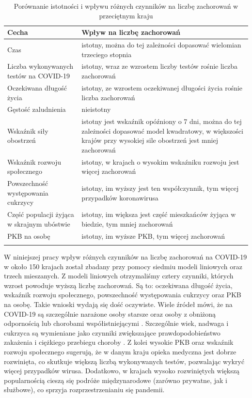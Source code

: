 \documentclass[12pt]{mwbk}
\theoremstyle{plain}
\theoremstyle{definition}
\theoremstyle{definition}
\newcommand\zrodlo[1]{\par\vspace{-3mm}{\small\textit{Źródło: }#1 }}
\begin{document}
\begin{longtable}{| p{} | p{} |}
	\hline
	Cecha & Wpływ na liczbę zachorowań \\ \hline \hline 
	Czas & istotny, można do tej zależności dopasować wielomian trzeciego stopnia \\ \hline
	Liczba wykonywanych testów na COVID-19 & istotny, wraz ze wzrostem liczby testów rośnie liczba zachorowań \\ \hline
	Oczekiwana długość życia & istotny, ze wzrostem oczekiwanej długości życia rośnie liczba zachorowań \\ \hline 
	Gęstość zaludnienia & nieistotny \\ \hline
	Wskaźnik siły obostrzeń & istotny jest wskaźnik opóźniony o 7 dni, można do tej zależności dopasować model kwadratowy, w większości krajów przy wysokiej sile obostrzeń jest mniej zachorowań \\ \hline
	Wskaźnik rozwoju społecznego & istotny, w krajach o wysokim wskaźniku rozwoju jest więcej zachorowań \\ \hline
	Powszechność występowania cukrzycy & istotny, im wyższy jest ten współczynnik, tym więcej przypadków koronawirusa \\ \hline
	Część populacji żyjąca w skrajnym ubóstwie & istotny, im większa jest część mieszkańców żyjąca w biedzie, tym mniej zachorowań \\ \hline
	PKB na osobę & istotny, im wyższe PKB, tym więcej zachorowań \\ \hline
	\caption{Porównanie istotności i wpływu różnych czynników na liczbę zachorowań w przeciętnym kraju}
	
	\label{tab:istotnosc}
	
	\end{longtable}
\begin{center}\zrodlo{Opracowanie własne}
	\end{center}


W niniejszej pracy wpływ różnych czynników na liczbę zachorowań na COVID-19 w około 150 krajach został zbadany przy pomocy siedmiu modeli liniowych oraz trzech mieszanych. Z modeli liniowych otrzymaliśmy cztery czynniki, których wzrost powoduje wyższą liczbę zachorowań. Są to: oczekiwana długość życia, wskaźnik rozwoju społecznego, powszechność występowania cukrzycy oraz PKB na osobę. Takie wnioski wydają się dość oczywiste. Wiele źródeł mówi, że na COVID-19 są szczególnie narażone osoby starsze oraz osoby z obniżoną odpornością lub chorobami współistniejącymi \cite{narazenie}. Szczególnie wiek, nadwaga i cukrzyca są wymieniane jako czynniki zwiększające prawdopodobieństwo zakażenia i ciężkiego przebiegu choroby \cite{covid-19}. Z kolei wysokie PKB oraz wskaźnik rozwoju społecznego sugerują, że w danym kraju opieka medyczna jest dobrze rozwinięta, co skutkuje większą liczbą wykonywanych testów, pozwalając wykryć więcej przypadków wirusa. Dodatkowo, w krajach wysoko rozwiniętych większą popularnością cieszą się podróże międzynarodowe (zarówno prywatne, jak i służbowe), co sprzyja rozprzestrzenianiu się pandemii.
\end{document}
